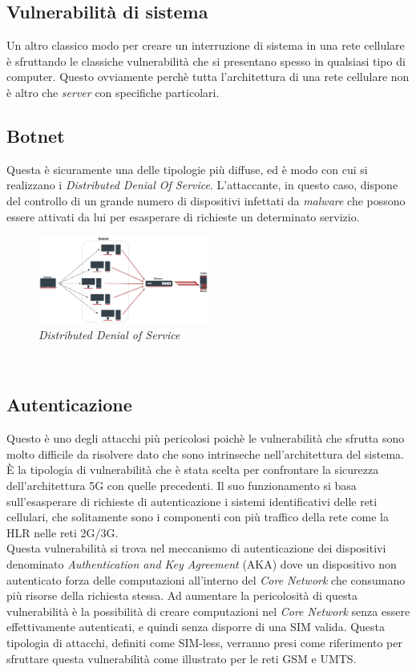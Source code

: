 \subsection{Vulnerabilità di sistema}
Un altro classico modo per creare un interruzione di sistema in una rete cellulare è sfruttando le classiche vulnerabilità che si presentano spesso in qualsiasi tipo di computer.
Questo ovviamente perchè tutta l'architettura di una rete cellulare non è altro che \textit{server} con specifiche particolari.

\subsection{Botnet}
Questa è sicuramente una delle tipologie più diffuse, ed è modo con cui si realizzano i \textit{Distributed Denial Of Service}. L'attaccante, in questo caso, dispone del controllo di 
un grande numero di dispositivi infettati da \textit{malware} che possono essere attivati da lui per esasperare di richieste un determinato servizio.
\begin{figure}[h]
    \centering
    \includegraphics[width=0.5\textwidth]{images/ddos.jpg}
    \caption{\textit{Distributed Denial of Service}}
\end{figure}\\

\subsection{Autenticazione}
Questo è uno degli attacchi più pericolosi poichè le vulnerabilità che sfrutta sono molto difficile da risolvere dato che sono intrinseche nell'architettura del sistema.
È la tipologia di vulnerabilità che è stata scelta per confrontare la sicurezza dell'architettura 5G con quelle precedenti.
Il suo funzionamento si basa sull'esasperare di richieste di autenticazione i sistemi identificativi delle reti cellulari, che solitamente 
sono i componenti con più traffico della rete come la HLR nelle reti 2G/3G.\\
Questa vulnerabilità si trova nel meccanismo di autenticazione dei dispositivi denominato \textit{Authentication and Key Agreement} (AKA) dove un dispositivo
non autenticato forza delle computazioni all'interno del \textit{Core Network} che consumano più risorse della richiesta stessa\cite{umts-dos}.
Ad aumentare la pericolosità di questa vulnerabilità è la possibilità di creare computazioni nel \textit{Core Network} senza essere effettivamente autenticati, e quindi 
senza disporre di una SIM valida. Questa tipologia di attacchi, definiti come SIM-less, verranno presi come riferimento per sfruttare questa vulnerabilità come illustrato per le 
reti GSM\cite{gsm-dos-simless} e UMTS\cite{umts-dos}.




